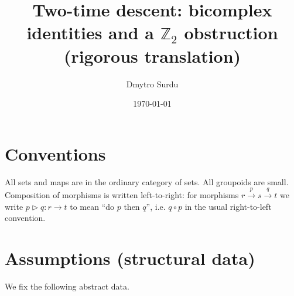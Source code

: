 \documentclass[aps,prl,reprint]{revtex4-2}
\newcommand{\Ztwo}{\mathbb{Z}_2}
\theoremstyle{definition}
\theoremstyle{plain}
\begin{document}
\title{Two-time descent: bicomplex identities and a $\Ztwo$ obstruction (rigorous translation)}
\author{Dmytro Surdu}
\date{\today}
\maketitle


\section*{Conventions}\label{sec:limited-scope-theorem-translation-clean-001}
All sets and maps are in the ordinary category of sets.
All groupoids are small.
Composition of morphisms is written left-to-right: for morphisms
$r\xrightarrow{p}s\xrightarrow{q}t$ we write $p\triangleright q:r\to t$ to mean
``do $p$ then $q$'', i.e. $q\circ p$ in the usual right-to-left convention.

\section{Assumptions (structural data)}
\label{sec:assumptions}
We fix the following abstract data.
\end{document}
